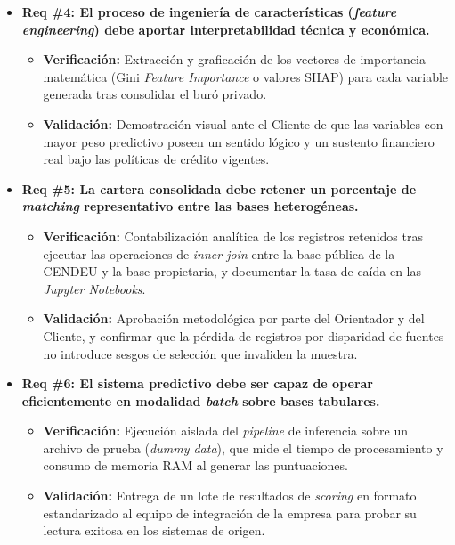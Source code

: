 \documentclass[
11pt, %
]{charter}
\begin{document}
\begin{itemize}
    \item \textbf{Req \#4: El proceso de ingeniería de características (\textit{feature engineering}) debe aportar interpretabilidad técnica y económica.}
    \begin{itemize}
        \item \textbf{Verificación:} Extracción y graficación de los vectores de importancia matemática (Gini \textit{Feature Importance} o valores SHAP) para cada variable generada tras consolidar el buró privado.
        \item \textbf{Validación:} Demostración visual ante el Cliente de que las variables con mayor peso predictivo poseen un sentido lógico y un sustento financiero real bajo las políticas de crédito vigentes.
    \end{itemize}

    \item \textbf{Req \#5: La cartera consolidada debe retener un porcentaje de \textit{matching} representativo entre las bases heterogéneas.}
    \begin{itemize}
        \item \textbf{Verificación:} Contabilización analítica de los registros retenidos tras ejecutar las operaciones de \textit{inner join} entre la base pública de la CENDEU y la base propietaria, y documentar la tasa de caída en las \textit{Jupyter Notebooks}.
        \item \textbf{Validación:} Aprobación metodológica por parte del Orientador y del Cliente, y confirmar que la pérdida de registros por disparidad de fuentes no introduce sesgos de selección que invaliden la muestra.
    \end{itemize}

    \item \textbf{Req \#6: El sistema predictivo debe ser capaz de operar eficientemente en modalidad \textit{batch} sobre bases tabulares.}
    \begin{itemize}
        \item \textbf{Verificación:} Ejecución aislada del \textit{pipeline} de inferencia sobre un archivo de prueba (\textit{dummy data}), que mide el tiempo de procesamiento y consumo de memoria RAM al generar las puntuaciones.
        \item \textbf{Validación:} Entrega de un lote de resultados de \textit{scoring} en formato estandarizado al equipo de integración de la empresa para probar su lectura exitosa en los sistemas de origen.
    \end{itemize}


\end{itemize}
\end{document}
